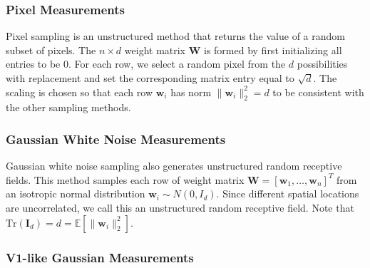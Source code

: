 \documentclass{article}
\renewcommand{\vec}{\mathbf}
\newcommand{\mat}{\mathbf}
\begin{document}
\subsubsection{Pixel Measurements}

Pixel sampling is an unstructured method that returns the value of a random subset of pixels.
The $n \times d$ weight matrix $\mat W$ is formed by first initializing all entries to be 0.
For each row, we select a random pixel from the $d$ possibilities with replacement and set the corresponding matrix entry equal to $\sqrt{d}$.
The scaling is chosen so that each row $\vec w_i$ has norm $\|\vec w_i \|_2^2 = d$ to be consistent with the other sampling methods.


\subsubsection{Gaussian White Noise Measurements}

Gaussian white noise sampling also generates unstructured random receptive fields.
This method samples each row of weight matrix $\mat W = [ \vec w_1, \ldots, \vec w_n ]^T$ from an isotropic normal distribution
$\vec w_i \sim N(0, I_d) $.
Since different spatial locations are uncorrelated, we call this an unstructured random receptive field.
Note that $\mathrm{Tr}(\mat I_d) = d = \mathbb{E}[ \| \vec w_i \|_2^2 ]$.



\subsubsection{V1-like Gaussian Measurements}
\end{document}
